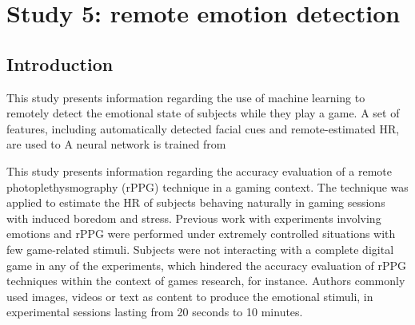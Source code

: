 \section{Study 5: remote emotion detection}
\label{s:study5}

\subsection{Introduction}

This study presents information regarding the use of machine learning to remotely detect the emotional state of subjects while they play a game. A set of features, including automatically detected facial cues and remote-estimated HR, are used to  A neural network is trained from

This study presents information regarding the accuracy evaluation of a remote photoplethysmography (rPPG) technique in a gaming context. The technique was applied to estimate the HR of subjects behaving naturally in gaming sessions with induced boredom and stress. Previous work with experiments involving emotions and rPPG were performed under extremely controlled situations with few game-related stimuli. Subjects were not interacting with a complete digital game in any of the experiments, which hindered the accuracy evaluation of rPPG techniques within the context of games research, for instance. Authors commonly used images, videos or text as content to produce the emotional stimuli, in experimental sessions lasting from 20 seconds to 10 minutes.



